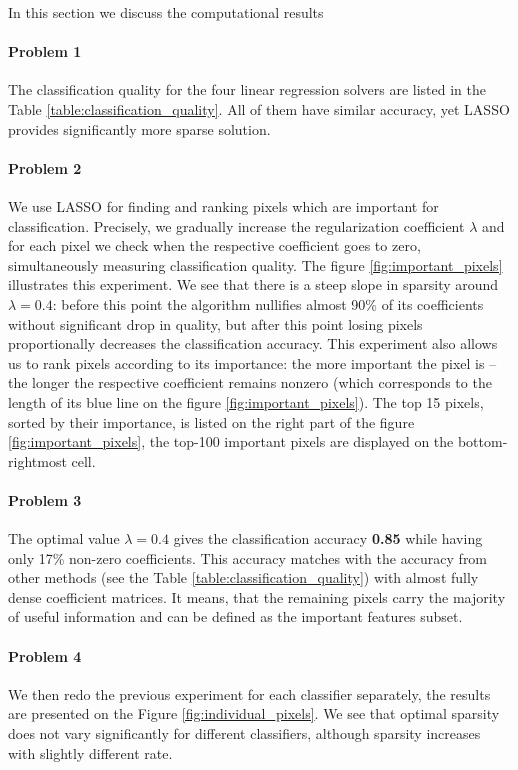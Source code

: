 \documentclass{article}
\begin{document}
In this section we discuss the computational results
\paragraph{Problem 1} The classification quality for the four linear regression solvers are listed in the Table \ref{table:classification_quality}. All of them have similar accuracy, yet LASSO provides significantly more sparse solution.

\paragraph{Problem 2} We use LASSO for finding and ranking pixels which are  important for classification. Precisely, we gradually increase the regularization coefficient $\lambda$ and for each pixel we check when the respective coefficient goes to zero, simultaneously measuring classification quality. The figure \ref{fig:important_pixels} illustrates this experiment. We see that there is a steep slope in sparsity around $\lambda = 0.4$: before this point the algorithm nullifies almost 90\% of its coefficients without significant drop in quality, but after this point losing pixels proportionally decreases the classification accuracy. This experiment also allows us to rank pixels according to its importance: the more important the pixel is -- the longer the respective coefficient remains nonzero (which corresponds to the length of its blue line on the figure \ref{fig:important_pixels}). The top 15 pixels, sorted by their importance, is listed on the right part of the figure \ref{fig:important_pixels}, the top-100 important pixels are displayed on the bottom-rightmost cell. 

\paragraph{Problem 3} The optimal value $\lambda = 0.4$ gives the classification accuracy \textbf{0.85} while having only 17\% non-zero coefficients. This accuracy matches with the accuracy from other methods (see the Table \ref{table:classification_quality}) with almost fully dense coefficient matrices. It means, that the remaining pixels carry the majority of useful information and can be defined as the important features subset.

\paragraph{Problem 4} We then redo the previous experiment for each classifier separately, the results are presented on the Figure \ref{fig:individual_pixels}. We see that optimal sparsity does not vary significantly for different classifiers, although sparsity increases with slightly different rate.
\end{document}
